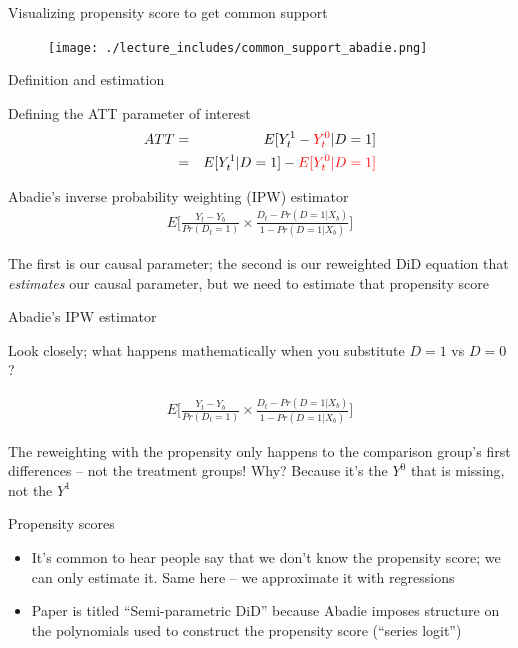 \documentclass{beamer}
\begin{document}
\begin{frame}{Visualizing propensity score to get common support}

	\begin{figure}
	\texttt{[image: ./lecture\_includes/common\_support\_abadie.png]}
	\end{figure}

\end{frame}

\begin{frame}{Definition and estimation}

Defining the ATT parameter of interest
\begin{eqnarray*}
ATT &=& E[Y^1_t - \textcolor{red}{Y^0_t} |D=1] \\
&=&E[Y^1_t  | D = 1 ] - \textcolor{red}{E[Y^0_t | D=1]}
\end{eqnarray*}

\bigskip
Abadie's inverse probability weighting (IPW) estimator
\begin{eqnarray*}
E\bigg [ \frac{Y_t - Y_b}{Pr(D_t=1)} \times \frac{D_t - Pr(D=1|X_b)}{1-Pr(D=1|X_b)} \bigg ]
\end{eqnarray*}

\bigskip

The first is our causal parameter; the second is our reweighted DiD equation that \emph{estimates} our causal parameter, but we need to estimate that propensity score


\end{frame}

\begin{frame}{Abadie's IPW estimator}

Look closely; what happens mathematically when you substitute $D=1$ vs $D=0$?

\begin{eqnarray*}
E\bigg [ \frac{Y_t - Y_b}{Pr(D_t=1)} \times \frac{D_t - Pr(D=1|X_b)}{1-Pr(D=1|X_b)} \bigg ]
\end{eqnarray*}

\bigskip

The reweighting with the propensity only happens to the comparison group's first differences -- not the treatment groups!  Why?  Because it's the $Y^0$ that is missing, not the $Y^1$

\end{frame}



\begin{frame}{Propensity scores}

\begin{itemize}
\item It's common to hear people say that we don't know the propensity score; we can only estimate it. Same here -- we approximate it with regressions
\item Paper is titled ``Semi-parametric DiD'' because Abadie imposes structure on the polynomials used to construct the propensity score (``series logit'')
\end{itemize}

\end{frame}
\end{document}
